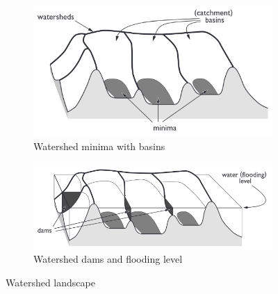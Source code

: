 \begin{figure}[h!]
	\begin{subfigure}{0.49\textwidth}
		\centerline{
			\includegraphics[scale=0.5]{images/watershed1.png}}
		\caption{Watershed minima with basins \cite{hahnIWTinteractiveWatershedTransform2003}}\label{fig:water1}
	\end{subfigure}
	\begin{subfigure}{0.49\textwidth}
		\centerline{
			\includegraphics[scale=0.5]{images/watershed2.png}}
		\caption{Watershed dams and flooding level \cite{hahnIWTinteractiveWatershedTransform2003}}\label{fig:water2}
	\end{subfigure}
	\caption{Watershed landscape}\label{fig:watershed}
\end{figure}


